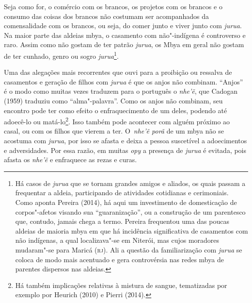 Seja como for, o comércio com os brancos, os projetos com os brancos e o
consumo das coisas dos brancos não costumam ser acompanhados da
comensalidade com os brancos, ou seja, do comer junto e viver junto com
\emph{jurua}. Na maior parte das aldeias mbya, o casamento com não"-indígena é
controverso e raro. Assim como não gostam de ter patrão \emph{jurua}, os Mbya
em geral não gostam de ter cunhado, genro ou sogro \emph{jurua}\footnote{Há
casos de \emph{jurua} que se tornam grandes amigos e aliados, os quais passam
a frequentar a aldeia, participando de atividades cotidianas e
cerimoniais. Como aponta Pereira (2014), há aqui um investimento de
domesticação de corpos"-afetos visando sua ``guaranização'', ou a
construção de um parentesco que, contudo, jamais chega a termo. Pereira
frequentou uma das poucas aldeias de maioria mbya em que há incidência
significativa de casamentos com não indígenas, a qual localizava"-se em
Niterói, mas cujos moradores mudaram"-se para Maricá (\textsc{rj}). Ali a questão
da familiarização com \emph{jurua} se coloca de modo mais acentuado e gera
controvérsia nas redes mbya de parentes dispersos nas aldeias.}. 

Uma das alegações mais recorrentes que ouvi para a proibição ou ressalva
de casamentos e geração de filhos com \emph{jurua} é que os anjos não
combinam. ``Anjos'' é o modo como muitas vezes traduzem para o português
o \emph{nhe’ẽ}, que Cadogan (1959) traduziu como ``alma"-palavra''. Como os
anjos não combinam, seu encontro pode ter como efeito o enfraquecimento
de um deles, podendo até adoecê-lo ou matá-lo\footnote{Há também
implicações relativas à mistura de sangue, tematizadas por exemplo por
Heurich (2010) e Pierri (2014).}. Isso também pode acontecer com alguém
próximo ao casal, ou com os filhos que vierem a ter. O~\emph{nhe’ẽ porã}
de um mbya não se acostuma com \emph{jurua}, por isso se afasta e deixa a
pessoa suscetível a adoecimentos e adversidades. Por essa razão, em
muitas \emph{opy} a presença de \emph{jurua} é evitada, pois afasta os \emph{nhe’ẽ} e
enfraquece as rezas e curas.


